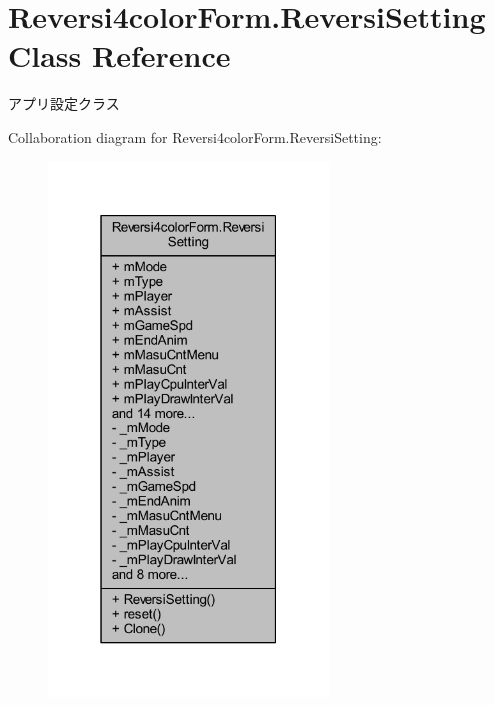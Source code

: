 \hypertarget{class_reversi4color_form_1_1_reversi_setting}{}\section{Reversi4color\+Form.\+Reversi\+Setting Class Reference}
\label{class_reversi4color_form_1_1_reversi_setting}


アプリ設定クラス  




Collaboration diagram for Reversi4color\+Form.\+Reversi\+Setting\+:
\nopagebreak
\begin{figure}[H]
\begin{center}
\leavevmode
\includegraphics[width=211pt]{class_reversi4color_form_1_1_reversi_setting__coll__graph}
\end{center}
\end{figure}
